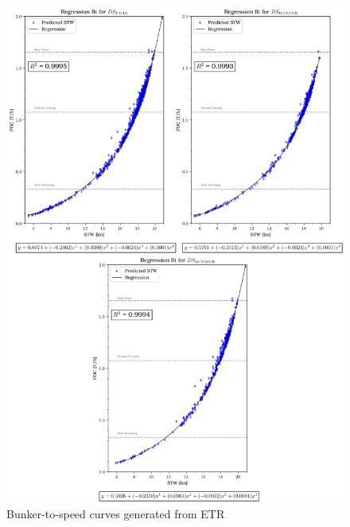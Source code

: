 
\newpage

\begin{figure}[h!]
    \centering
    \includegraphics[width=.9\linewidth]{02_figures/poly_etr_combi.png}
    \caption{Bunker-to-speed curves generated from ETR}
    \label{fig:FOC_plot_etr_combi}
\end{figure}

